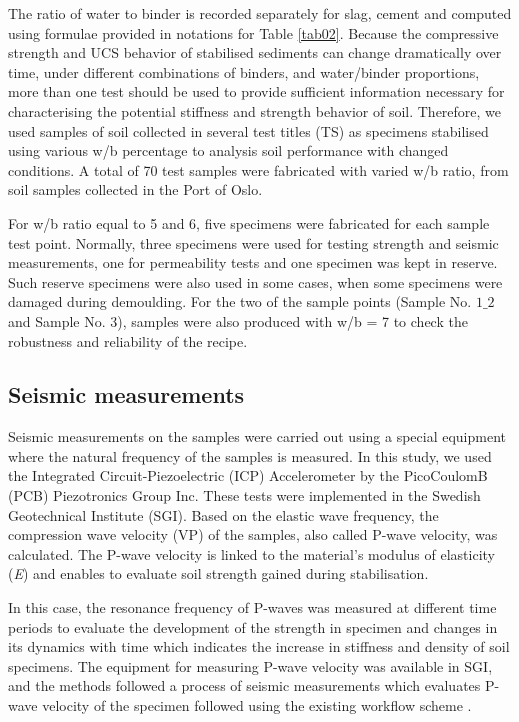 \documentclass[information,article,submit,pdftex,moreauthors]{Definitions/mdpi}
\begin{document}
The ratio of water to binder is recorded separately for slag, cement and computed using formulae provided in notations for Table \ref{tab02}. Because the compressive strength and UCS behavior of stabilised sediments can change dramatically over time, under different combinations of binders, and water/binder proportions, more than one test should be used to provide sufficient information necessary for characterising the potential stiffness and strength behavior of soil. Therefore, we used samples of soil collected in several test titles (TS) as specimens stabilised using various w/b percentage to analysis soil performance with changed conditions. A total of 70 test samples were fabricated with varied w/b ratio, from soil samples collected in the Port of Oslo. 

For w/b ratio equal to 5 and 6, five specimens were fabricated for each sample test point. Normally, three specimens were used for testing strength and seismic measurements, one for permeability tests and one specimen was kept in reserve. Such reserve specimens were also used in some cases, when some specimens were damaged during demoulding. For the two of the sample points (Sample No. $1\_2$ and Sample No. 3), samples were also produced with w/b = 7 to check the robustness and reliability of the recipe. 

\subsection{Seismic measurements}

Seismic measurements on the samples were carried out using a special equipment where the natural frequency of the samples is measured. In this study, we used the Integrated Circuit-Piezoelectric (ICP) Accelerometer by the PicoCoulomB (PCB) Piezotronics Group Inc. These tests were implemented in the Swedish Geotechnical Institute (SGI). Based on the elastic wave frequency, the compression wave velocity (VP) of the samples, also called P-wave velocity, was calculated. The P-wave velocity is linked to the material's modulus of elasticity (\emph{E}) and enables to evaluate soil strength gained during stabilisation. 

In this case, the resonance frequency of P-waves was measured at different time periods to evaluate the development of the strength in specimen and changes in its dynamics with time which indicates the increase in stiffness and density of soil specimens. The equipment for measuring P-wave velocity was available in SGI, and the methods followed a process of seismic measurements which evaluates P-wave velocity of the specimen followed using the existing workflow scheme \cite{Lindh202224}. 
\end{document}
